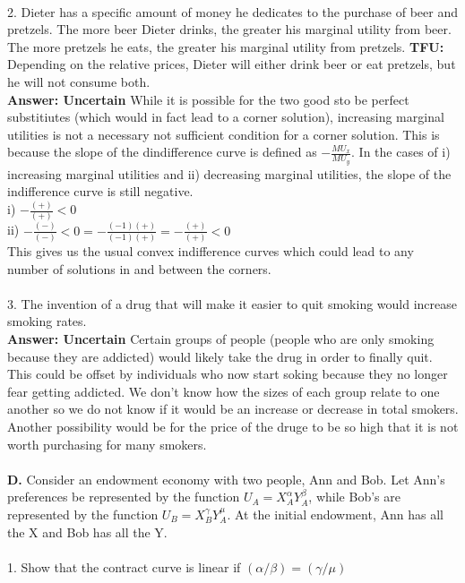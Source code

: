\documentclass[11pt]{article}
\begin{document}
\\
2. Dieter has a specific amount of money he dedicates to the purchase of beer and pretzels. The more beer Dieter drinks, the greater his marginal utility from beer. The more pretzels he eats, the greater his marginal utility from pretzels. \textbf{TFU:} Depending on the relative prices, Dieter will either drink beer or eat pretzels, but he will not consume both.\\
\textbf{Answer: Uncertain }While it is possible for the two good sto be perfect substitiutes (which would in fact lead to a corner solution), increasing marginal utilities is not a necessary not sufficient condition for a corner solution. This is because the slope of the dindifference curve is defined as $-\frac{MU_x}{MU_y}$. In the cases of i) increasing marginal utilities and ii) decreasing marginal utilities, the slope of the indifference curve is still negative.\\
i) $-\frac{(+)}{(+)} < 0$\\
ii) $-\frac{(-)}{(-)} < 0 = -\frac{(-1)(+)}{(-1)(+)} = -\frac{(+)}{(+)} < 0$\\
This gives us the usual convex indifference curves which could lead to any number of solutions in and between the corners.\\
\\
3. The invention of a drug that will make it easier to quit smoking would increase smoking rates.\\
\textbf{Answer: Uncertain} Certain groups of people (people who are only smoking because they are addicted) would likely take the drug in order to finally quit. This could be offset by individuals who now start soking because they no longer fear getting addicted. We don't know how the sizes of each group relate to one another so we do not know if it would be an increase or decrease in total smokers. Another possibility would be for the price of the druge to be so high that it is not worth purchasing for many smokers.\\
\\
\textbf{D.} Consider an endowment economy with two people, Ann and Bob. Let Ann's preferences be represented by the function $U_A = X_A^\alpha Y_A^\beta$, while Bob's are represented by the function $U_B = X_B^\gamma Y_A^\mu$. At the initial endowment, Ann has all the X and Bob has all the Y.\\
\\
1. Show that the contract curve is linear if $(\alpha /\beta) = (\gamma /\mu)$\\
\end{document}
